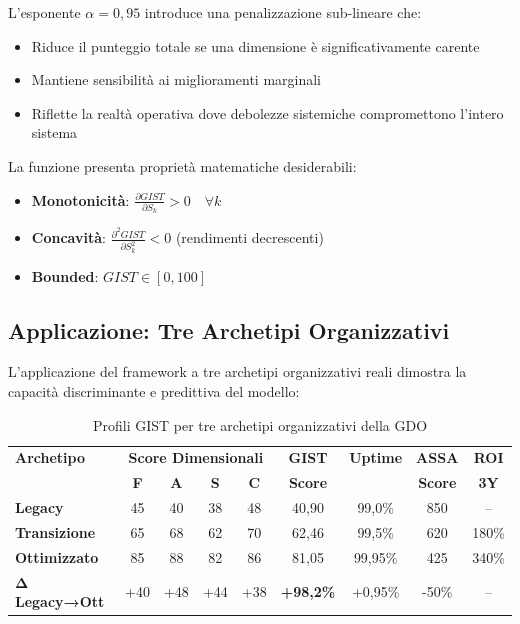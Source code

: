 L'esponente $\alpha = 0,95$ introduce una penalizzazione sub-lineare che:
\begin{itemize}
\item Riduce il punteggio totale se una dimensione è significativamente carente
\item Mantiene sensibilità ai miglioramenti marginali
\item Riflette la realtà operativa dove debolezze sistemiche compromettono l'intero sistema
\end{itemize}

La funzione presenta proprietà matematiche desiderabili:
\begin{itemize}
\item \textbf{Monotonicità}: $\frac{\partial GIST}{\partial S_k} > 0 \quad \forall k$
\item \textbf{Concavità}: $\frac{\partial^2 GIST}{\partial S_k^2} < 0$ (rendimenti decrescenti)
\item \textbf{Bounded}: $GIST \in [0, 100]$
\end{itemize}

\subsection{\texorpdfstring{Applicazione: Tre Archetipi Organizzativi}{5.3.3 - Tre Archetipi}}
\label{subsec:5.3.3}

L'applicazione del framework a tre archetipi organizzativi reali dimostra la capacità discriminante e predittiva del modello:

\begin{table}[htbp]
\centering
\caption{Profili GIST per tre archetipi organizzativi della GDO}
\label{tab:gist_archetypes}
\begin{tabular}{@{}lcccccccc@{}}
\toprule
\textbf{Archetipo} & \multicolumn{4}{c}{\textbf{Score Dimensionali}} & \textbf{GIST} & \textbf{Uptime} & \textbf{ASSA} & \textbf{ROI} \\
& \textbf{F} & \textbf{A} & \textbf{S} & \textbf{C} & \textbf{Score} & & \textbf{Score} & \textbf{3Y} \\
\midrule
\textbf{Legacy} & 45 & 40 & 38 & 48 & 40,90 & 99,0\% & 850 & -- \\
\textbf{Transizione} & 65 & 68 & 62 & 70 & 62,46 & 99,5\% & 620 & 180\% \\
\textbf{Ottimizzato} & 85 & 88 & 82 & 86 & 81,05 & 99,95\% & 425 & 340\% \\
\midrule
\textbf{Δ Legacy→Ott} & +40 & +48 & +44 & +38 & \textbf{+98,2\%} & +0,95\% & -50\% & -- \\
\bottomrule
\end{tabular}
\end{table}

